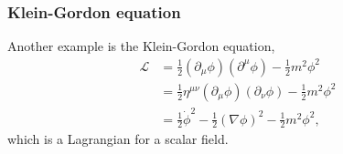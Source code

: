 \subsubsection{Klein-Gordon equation}
Another example is the Klein-Gordon equation,
\begin{equation}
\begin{aligned}
  \mathcal{L} &= \frac{1}{2}(\partial_\mu \phi)(\partial^\mu \phi) - \frac{1}{2}m^2\phi^2\\
              &= \frac{1}{2}\eta^{\mu\nu}(\partial_\mu \phi)(\partial_\nu \phi) - \frac{1}{2}m^2\phi^2\\
              &= \frac{1}{2} \dot \phi^2 - \frac{1}{2}(\nabla \phi)^2 - \frac{1}{2}m^2\phi^2,
\end{aligned}
\end{equation}
which is a Lagrangian for a scalar field.
